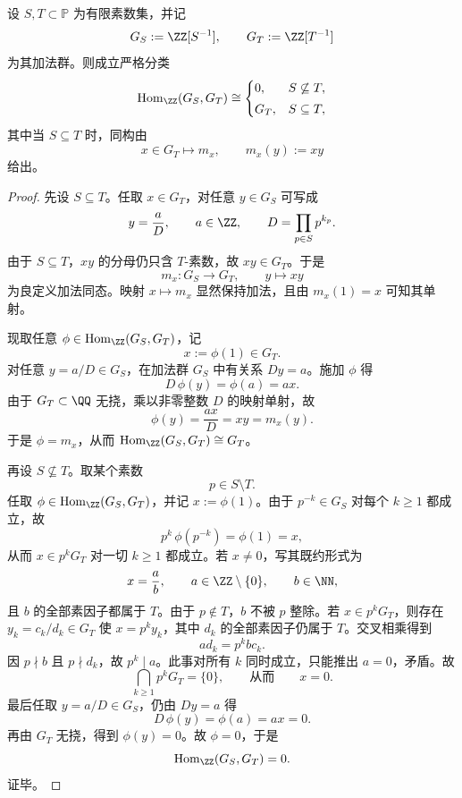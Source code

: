 \begin{theorem}[局部化数系之间的全部加法同态由局部化乘法完全刻画]\label{thm:xi-localized-integers-cross-hom-classification}
设 \(S,T\subset\mathbb P\) 为有限素数集，并记
\[
G_S:=\ZZ[S^{-1}],
\qquad
G_T:=\ZZ[T^{-1}]
\]
为其加法群。则成立严格分类
\[
\operatorname{Hom}_{\ZZ}(G_S,G_T)\cong
\begin{cases}
0,& S\not\subseteq T,\\[1mm]
G_T,& S\subseteq T,
\end{cases}
\]
其中当 \(S\subseteq T\) 时，同构由
\[
x\in G_T\longmapsto m_x,
\qquad
m_x(y):=xy
\]
给出。
\end{theorem}
\begin{proof}
先设 \(S\subseteq T\)。任取 \(x\in G_T\)，对任意 \(y\in G_S\) 可写成
\[
y=\frac{a}{D},
\qquad
a\in\ZZ,
\qquad
D=\prod_{p\in S}p^{k_p}.
\]
由于 \(S\subseteq T\)，\(xy\) 的分母仍只含 \(T\)-素数，故 \(xy\in G_T\)。于是
\[
m_x:G_S\to G_T,\qquad y\mapsto xy
\]
为良定义加法同态。映射 \(x\mapsto m_x\) 显然保持加法，且由 \(m_x(1)=x\) 可知其单射。

现取任意 \(\phi\in \operatorname{Hom}_{\ZZ}(G_S,G_T)\)，记
\[
x:=\phi(1)\in G_T.
\]
对任意 \(y=a/D\in G_S\)，在加法群 \(G_S\) 中有关系 \(Dy=a\)。施加 \(\phi\) 得
\[
D\,\phi(y)=\phi(a)=ax.
\]
由于 \(G_T\subset \QQ\) 无挠，乘以非零整数 \(D\) 的映射单射，故
\[
\phi(y)=\frac{ax}{D}=xy=m_x(y).
\]
于是 \(\phi=m_x\)，从而 \(\operatorname{Hom}_{\ZZ}(G_S,G_T)\cong G_T\)。

再设 \(S\not\subseteq T\)。取某个素数
\[
p\in S\setminus T.
\]
任取 \(\phi\in \operatorname{Hom}_{\ZZ}(G_S,G_T)\)，并记 \(x:=\phi(1)\)。由于 \(p^{-k}\in G_S\) 对每个 \(k\ge 1\) 都成立，故
\[
p^k\,\phi(p^{-k})=\phi(1)=x,
\]
从而 \(x\in p^kG_T\) 对一切 \(k\ge 1\) 都成立。若 \(x\neq 0\)，写其既约形式为
\[
x=\frac{a}{b},
\qquad
a\in\ZZ\setminus\{0\},
\qquad
b\in\NN,
\]
且 \(b\) 的全部素因子都属于 \(T\)。由于 \(p\notin T\)，\(b\) 不被 \(p\) 整除。若 \(x\in p^kG_T\)，则存在 \(y_k=c_k/d_k\in G_T\) 使 \(x=p^k y_k\)，其中 \(d_k\) 的全部素因子仍属于 \(T\)。交叉相乘得到
\[
ad_k=p^kbc_k.
\]
因 \(p\nmid b\) 且 \(p\nmid d_k\)，故 \(p^k\mid a\)。此事对所有 \(k\) 同时成立，只能推出 \(a=0\)，矛盾。故
\[
\bigcap_{k\ge 1}p^kG_T=\{0\},
\qquad\text{从而}\qquad
x=0.
\]
最后任取 \(y=a/D\in G_S\)，仍由 \(Dy=a\) 得
\[
D\,\phi(y)=\phi(a)=ax=0.
\]
再由 \(G_T\) 无挠，得到 \(\phi(y)=0\)。故 \(\phi=0\)，于是
\[
\operatorname{Hom}_{\ZZ}(G_S,G_T)=0.
\]
证毕。
\end{proof}

